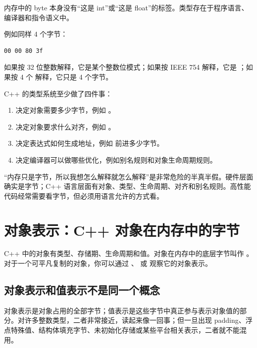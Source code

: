内存中的 byte 本身没有“这是 int”或“这是 float”的标签。类型存在于程序语言、编译器和指令语义中。

例如同样 4 个字节：

\begin{center}
\begin{minipage}{0.72\linewidth}
\begin{verbatim}
00 00 80 3f
\end{verbatim}
\end{minipage}
\end{center}

如果按 32 位整数解释，它是某个整数位模式；如果按 IEEE 754  解释，它是 ；如果按 4 个  解释，它只是 4 个字节。

C++ 的类型系统至少做了四件事：

\begin{enumerate}
  \item 决定对象需要多少字节，例如 。
  \item 决定对象要求什么对齐，例如 。
  \item 决定表达式如何生成地址，例如  前进多少字节。
  \item 决定编译器可以做哪些优化，例如别名规则和对象生命周期规则。
\end{enumerate}

\begin{warningbox}
“内存只是字节，所以我想怎么解释就怎么解释”是非常危险的半真半假。硬件层面确实是字节；C++ 语言层面有对象、类型、生命周期、对齐和别名规则。高性能代码经常需要看字节，但必须用语言允许的方式看。
\end{warningbox}

\section{对象表示：C++ 对象在内存中的字节}

C++ 中的对象有类型、存储期、生命周期和值。对象在内存中的底层字节叫作 。对于一个可平凡复制的对象，你可以通过 、 或  观察它的对象表示。

\subsection{对象表示和值表示不是同一个概念}

对象表示是对象占用的全部字节；值表示是这些字节中真正参与表示对象值的部分。对许多整数类型，二者非常接近，读起来像一回事；但一旦出现 padding、浮点特殊值、结构体填充字节、未初始化存储或某些平台相关表示，二者就不能混用。

